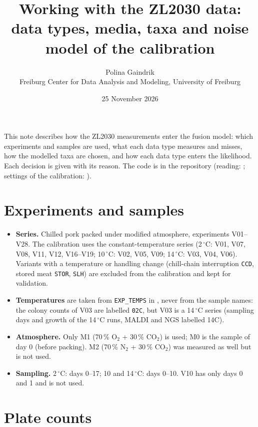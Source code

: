 \documentclass[11pt,a4paper]{article}
\title{Working with the ZL2030 data:\\ \large data types, media, taxa and noise model of the calibration}
\author{Polina Gaindrik \\ \small Freiburg Center for Data Analysis and Modeling, University of Freiburg}
\date{25 November 2026}
\newcommand{\code}[1]{\texttt{#1}}
\begin{document}
\maketitle

\noindent
This note describes how the ZL2030 measurements enter the fusion model: which experiments and samples are used, what each data type measures and misses, how the modelled taxa are chosen, and how each data type enters the likelihood. Each decision is given with its reason. The code is in the repository  (reading: ; settings of the calibration: ).

\section{Experiments and samples}

\begin{itemize}
\item \textbf{Series.} Chilled pork packed under modified atmosphere, experiments V01--V28. The calibration uses the constant-temperature series (2\,$^\circ$C: V01, V07, V08, V11, V12, V16--V19; 10\,$^\circ$C: V02, V05, V09; 14\,$^\circ$C: V03, V04, V06). Variants with a temperature or handling change (chill-chain interruption \code{CCD}, stored meat \code{STOR}, \code{SLH}) are excluded from the calibration and kept for validation.
\item \textbf{Temperatures} are taken from \code{EXP\_TEMPS} in , never from the sample names: the colony counts of V03 are labelled \code{02C}, but V03 is a 14\,$^\circ$C series (sampling days and growth of the 14\,$^\circ$C runs, MALDI and NGS labelled 14C).
\item \textbf{Atmosphere.} Only M1 (70\,\% O$_2$ + 30\,\% CO$_2$) is used; M0 is the sample of day 0 (before packing). M2 (70\,\% N$_2$ + 30\,\% CO$_2$) was measured as well but is not used.
\item \textbf{Sampling.} 2\,$^\circ$C: days 0--17; 10 and 14\,$^\circ$C: days 0--10. V10 has only days 0 and 1 and is not used.
\end{itemize}

\section{Plate counts}
\end{document}
